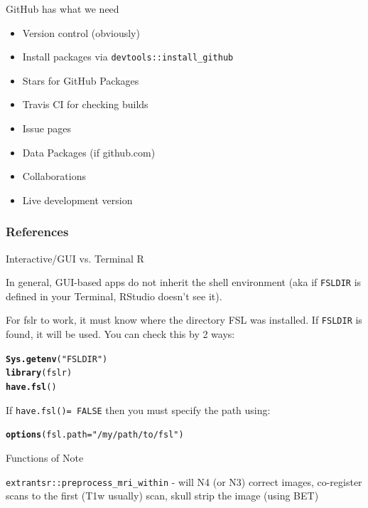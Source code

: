 \documentclass[11pt]{beamer}\usepackage[]{graphicx}\usepackage[]{color}
\makeatletter
\newcommand{\hlstr}[1]{\textcolor[rgb]{0.192,0.494,0.8}{#1}}%
\newcommand{\hlstd}[1]{\textcolor[rgb]{0.345,0.345,0.345}{#1}}%
\newcommand{\hlkwc}[1]{\textcolor[rgb]{0.333,0.667,0.333}{#1}}%
\newcommand{\hlkwd}[1]{\textcolor[rgb]{0.737,0.353,0.396}{\textbf{#1}}}%
\newenvironment{kframe}{%
 \def\at@end@of@kframe{}%
 \ifinner\ifhmode%
  \def\at@end@of@kframe{\end{minipage}}%
  \begin{minipage}{\columnwidth}%
 \fi\fi%
 \def\FrameCommand##1{\hskip\@totalleftmargin \hskip-\fboxsep
 \colorbox{shadecolor}{##1}\hskip-\fboxsep
     \hskip-\linewidth \hskip-\@totalleftmargin \hskip\columnwidth}%
 \MakeFramed {\advance\hsize-\width
   \@totalleftmargin\z@ \linewidth\hsize
   \@setminipage}}%
 {\par\unskip\endMakeFramed%
 \at@end@of@kframe}
\newenvironment{knitrout}{}{} %
\makeatother
\begin{document}
\begin{frame}[fragile]{GitHub has what we need}

\begin{itemize}
\item Version control (obviously)

\item Install packages via \verb|devtools::install_github|

\item Stars for GitHub Packages

\item Travis CI for checking builds

\item Issue pages

\item Data Packages (if github.com)

\item Collaborations

\item Live development version

\end{itemize}

\end{frame}


\begin{frame}[t,allowframebreaks]
  \frametitle{References}
  \printbibliography
 \end{frame}


\begin{frame}[fragile]{Interactive/GUI vs. Terminal R}

In general, GUI-based apps do not inherit the shell environment (aka if \verb|FSLDIR| is defined in your Terminal, RStudio doesn't see it).

For fslr to work, it must know where the directory FSL was installed.  If \verb|FSLDIR| is found, it will be used.  You can check this by 2 ways:

\begin{knitrout}
\color{fgcolor}\begin{kframe}
\begin{alltt}
\hlkwd{Sys.getenv}\hlstd{(}\hlstr{"FSLDIR"}\hlstd{)}
\hlkwd{library}\hlstd{(fslr)}
\hlkwd{have.fsl}\hlstd{()}
\end{alltt}
\end{kframe}
\end{knitrout}

If \verb|have.fsl()= FALSE| then you must specify the path using:

\begin{knitrout}
\color{fgcolor}\begin{kframe}
\begin{alltt}
\hlkwd{options}\hlstd{(}\hlkwc{fsl.path}\hlstd{=}\hlstr{"/my/path/to/fsl"}\hlstd{)}
\end{alltt}
\end{kframe}
\end{knitrout}


\end{frame}


\begin{frame}[fragile]{Functions of Note}

\verb|extrantsr::preprocess_mri_within| - will N4 (or N3) correct images, co-register scans to the first (T1w usually) scan, skull strip the image (using BET)

\end{frame}
\end{document}
